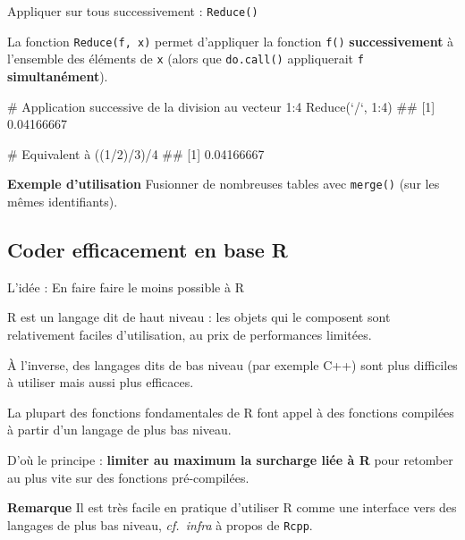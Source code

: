 \documentclass[12pt,handout,ignorenonframetext,]{beamer}
\newenvironment{Shaded}{}{}
\newcommand{\KeywordTok}[1]{\textcolor[rgb]{0.00,0.00,1.00}{{#1}}}
\newcommand{\DataTypeTok}[1]{{#1}}
\newcommand{\DecValTok}[1]{{#1}}
\newcommand{\StringTok}[1]{\textcolor[rgb]{0.00,0.50,0.50}{{#1}}}
\newcommand{\CommentTok}[1]{\textcolor[rgb]{0.00,0.50,0.00}{{#1}}}
\newcommand{\NormalTok}[1]{{#1}}
\renewenvironment{Shaded}{\begin{snugshade}}{\end{snugshade}}
\begin{document}
\begin{frame}[fragile]{\large Appliquer sur tous successivement :
\texttt{Reduce()}}

La fonction \texttt{Reduce(f,\ x)} permet d'appliquer la fonction
\texttt{f()} \textbf{successivement} à l'ensemble des éléments de
\texttt{x} (alors que \texttt{do.call()} appliquerait \texttt{f}
\textbf{simultanément}).

\pause \small

\begin{Shaded}
\begin{Highlighting}[]
\CommentTok{# Application successive de la division au vecteur 1:4}
\KeywordTok{Reduce}\NormalTok{(}\StringTok{`}\DataTypeTok{/}\StringTok{`}\NormalTok{, }\DecValTok{1}\NormalTok{:}\DecValTok{4}\NormalTok{)}
  \NormalTok{## [1] 0.04166667}

\CommentTok{# Equivalent à }
\NormalTok{((}\DecValTok{1}\NormalTok{/}\DecValTok{2}\NormalTok{)/}\DecValTok{3}\NormalTok{)/}\DecValTok{4}
  \NormalTok{## [1] 0.04166667}
\end{Highlighting}
\end{Shaded}

\pause \normalsize

\textbf{Exemple d'utilisation} Fusionner de nombreuses tables avec
\texttt{merge()} (sur les mêmes identifiants).

\end{frame}

\subsection{Coder efficacement en base
R}\label{coder-efficacement-en-base-r}

\begin{frame}[fragile]{L'idée : En faire faire le moins possible à R}

R est un langage dit \og de haut niveau \fg{} : les objets qui le
composent sont relativement faciles d'utilisation, au prix de
performances limitées.

\vfill

À l'inverse, des langages dits de \og bas niveau \fg{} (par exemple C++)
sont plus difficiles à utiliser mais aussi plus efficaces.

\vfill

\pause La plupart des fonctions fondamentales de R font appel à des
fonctions compilées à partir d'un langage de plus bas niveau.

\vfill

D'où le principe : \textbf{limiter au maximum la surcharge liée à R}
pour retomber au plus vite sur des fonctions pré-compilées.

\pause \vfill

\textbf{Remarque} Il est très facile en pratique d'utiliser R comme une
interface vers des langages de plus bas niveau, \emph{cf.~infra} à
propos de \texttt{Rcpp}.

\end{frame}
\end{document}
